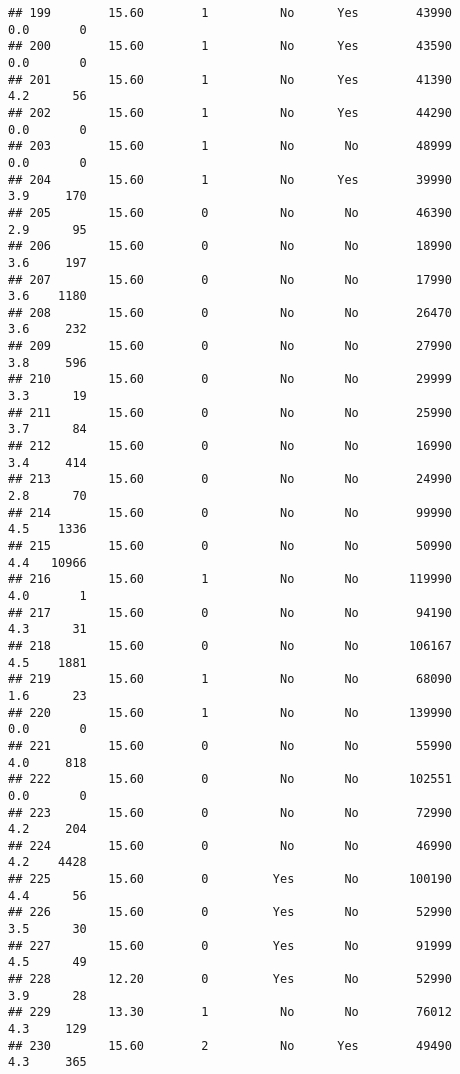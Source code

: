 \documentclass[
]{article}
\begin{document}
\begin{verbatim}
## 199        15.60        1          No      Yes        43990         0.0       0
## 200        15.60        1          No      Yes        43590         0.0       0
## 201        15.60        1          No      Yes        41390         4.2      56
## 202        15.60        1          No      Yes        44290         0.0       0
## 203        15.60        1          No       No        48999         0.0       0
## 204        15.60        1          No      Yes        39990         3.9     170
## 205        15.60        0          No       No        46390         2.9      95
## 206        15.60        0          No       No        18990         3.6     197
## 207        15.60        0          No       No        17990         3.6    1180
## 208        15.60        0          No       No        26470         3.6     232
## 209        15.60        0          No       No        27990         3.8     596
## 210        15.60        0          No       No        29999         3.3      19
## 211        15.60        0          No       No        25990         3.7      84
## 212        15.60        0          No       No        16990         3.4     414
## 213        15.60        0          No       No        24990         2.8      70
## 214        15.60        0          No       No        99990         4.5    1336
## 215        15.60        0          No       No        50990         4.4   10966
## 216        15.60        1          No       No       119990         4.0       1
## 217        15.60        0          No       No        94190         4.3      31
## 218        15.60        0          No       No       106167         4.5    1881
## 219        15.60        1          No       No        68090         1.6      23
## 220        15.60        1          No       No       139990         0.0       0
## 221        15.60        0          No       No        55990         4.0     818
## 222        15.60        0          No       No       102551         0.0       0
## 223        15.60        0          No       No        72990         4.2     204
## 224        15.60        0          No       No        46990         4.2    4428
## 225        15.60        0         Yes       No       100190         4.4      56
## 226        15.60        0         Yes       No        52990         3.5      30
## 227        15.60        0         Yes       No        91999         4.5      49
## 228        12.20        0         Yes       No        52990         3.9      28
## 229        13.30        1          No       No        76012         4.3     129
## 230        15.60        2          No      Yes        49490         4.3     365

\end{verbatim}
\end{document}
